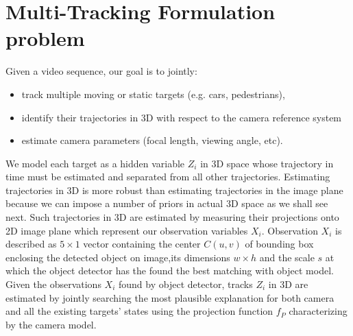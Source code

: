 \section{ Multi-Tracking Formulation problem}\label{sec: MultiTracking Model}
Given a video sequence, our goal is to jointly:
\begin{itemize}
\item track multiple moving or static targets (e.g. cars, pedestrians), 
\item identify their trajectories in 3D with respect to the camera reference system
\item estimate camera parameters (focal length, viewing
angle, etc). 
\end{itemize}
We model each target as a hidden variable $Z_i$ in 3D space whose trajectory in time must be estimated and separated from all other trajectories.
Estimating trajectories in 3D is more robust than estimating trajectories in the image plane because we can impose a number of priors in actual 3D space as we shall see next.
Such trajectories in 3D are estimated by measuring their projections onto 2D image plane which represent our observation variables $X_i$.
Observation $X_i$ is described as $5\times1$ vector containing the center $C(u,v)$ of bounding box enclosing the detected object on image,its dimensions $w \times h$ and the scale $s$ at which the object detector has the found the best matching with object model.
Given the observations $X_i$ found by object detector, tracks $Z_i$ in 3D are estimated by jointly searching the most plausible explanation for both camera and all the existing targets’ states using the projection function $f_P$ characterizing by the camera model.\\
